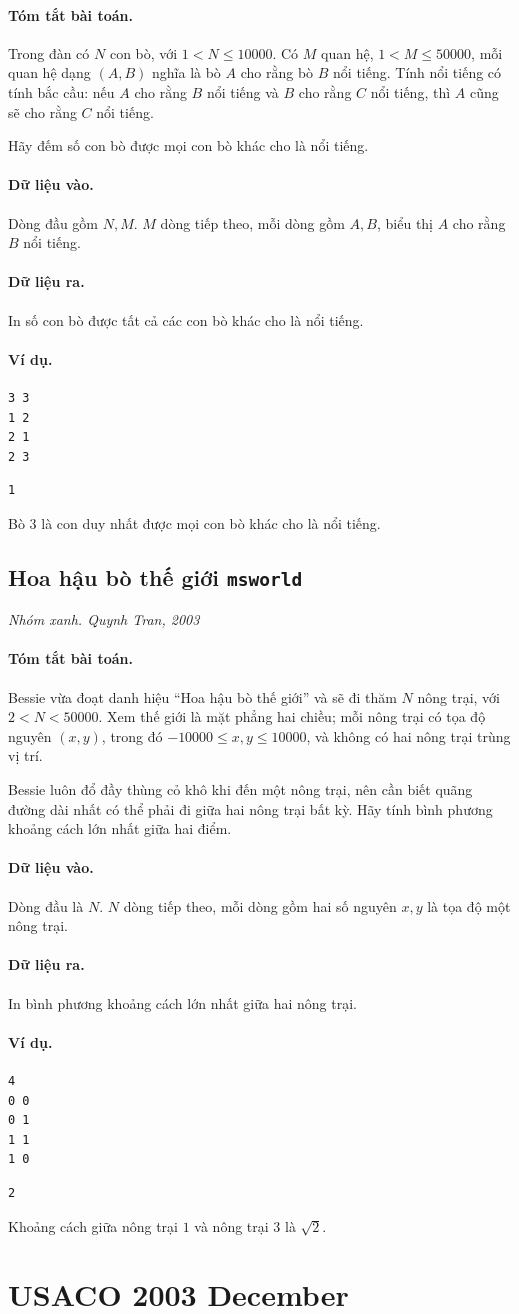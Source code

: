 \documentclass[11pt]{article}
\newcommand{\problem}[4]{%
  \subsection[#1 (#2)]{#1 \hfill {\normalsize\texttt{#2}}}%
  \noindent\textit{#3. #4}\par\smallskip
}
\newcommand{\iosec}[1]{\paragraph{#1}}
\begin{document}
\iosec{Tóm tắt bài toán.}
Trong đàn có \(N\) con bò, với \(1<N\le 10000\). Có \(M\) quan hệ,
\(1<M\le 50000\), mỗi quan hệ dạng \((A,B)\) nghĩa là bò \(A\) cho rằng bò
\(B\) nổi tiếng. Tính nổi tiếng có tính bắc cầu: nếu \(A\) cho rằng \(B\) nổi
tiếng và \(B\) cho rằng \(C\) nổi tiếng, thì \(A\) cũng sẽ cho rằng \(C\) nổi
tiếng.

Hãy đếm số con bò được mọi con bò khác cho là nổi tiếng.

\iosec{Dữ liệu vào.}
Dòng đầu gồm \(N,M\). \(M\) dòng tiếp theo, mỗi dòng gồm \(A,B\), biểu thị
\(A\) cho rằng \(B\) nổi tiếng.

\iosec{Dữ liệu ra.}
In số con bò được tất cả các con bò khác cho là nổi tiếng.

\iosec{Ví dụ.}
\begin{verbatim}
3 3
1 2
2 1
2 3
\end{verbatim}

\begin{verbatim}
1
\end{verbatim}

Bò \(3\) là con duy nhất được mọi con bò khác cho là nổi tiếng.

\problem{Hoa hậu bò thế giới}{msworld}{Nhóm xanh}{Quynh Tran, 2003}

\iosec{Tóm tắt bài toán.}
Bessie vừa đoạt danh hiệu ``Hoa hậu bò thế giới'' và sẽ đi thăm \(N\) nông
trại, với \(2<N<50000\). Xem thế giới là mặt phẳng hai chiều; mỗi nông trại có
tọa độ nguyên \((x,y)\), trong đó \(-10000\le x,y\le 10000\), và không có hai
nông trại trùng vị trí.

Bessie luôn đổ đầy thùng cỏ khô khi đến một nông trại, nên cần biết quãng
đường dài nhất có thể phải đi giữa hai nông trại bất kỳ. Hãy tính bình phương
khoảng cách lớn nhất giữa hai điểm.

\iosec{Dữ liệu vào.}
Dòng đầu là \(N\). \(N\) dòng tiếp theo, mỗi dòng gồm hai số nguyên \(x,y\) là
tọa độ một nông trại.

\iosec{Dữ liệu ra.}
In bình phương khoảng cách lớn nhất giữa hai nông trại.

\iosec{Ví dụ.}
\begin{verbatim}
4
0 0
0 1
1 1
1 0
\end{verbatim}

\begin{verbatim}
2
\end{verbatim}

Khoảng cách giữa nông trại \(1\) và nông trại \(3\) là \(\sqrt{2}\).

\section{USACO 2003 December}
\end{document}
